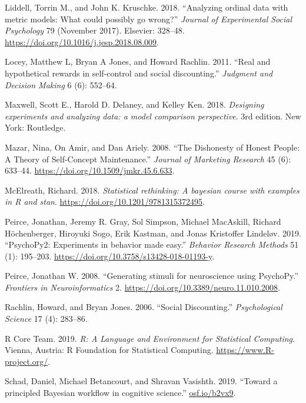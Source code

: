 \documentclass[smallextended]{svjour3}       %
\begin{document}
\leavevmode\hypertarget{ref-Liddell2018}{}%
Liddell, Torrin M., and John K. Kruschke. 2018. ``Analyzing ordinal data
with metric models: What could possibly go wrong?'' \emph{Journal of
Experimental Social Psychology} 79 (November 2017). Elsevier: 328--48.
\url{https://doi.org/10.1016/j.jesp.2018.08.009}.

\leavevmode\hypertarget{ref-Locey2011}{}%
Locey, Matthew L, Bryan A Jones, and Howard Rachlin. 2011. ``Real and
hypothetical rewards in self-control and social discounting.''
\emph{Judgment and Decision Making} 6 (6): 552--64.

\leavevmode\hypertarget{ref-Maxwell2018}{}%
Maxwell, Scott E., Harold D. Delaney, and Kelley Ken. 2018.
\emph{Designing experiments and analyzing data: a model comparison
perspective}. 3rd edition. New York: Routledge.

\leavevmode\hypertarget{ref-Mazar2008}{}%
Mazar, Nina, On Amir, and Dan Ariely. 2008. ``The Dishonesty of Honest
People: A Theory of Self-Concept Maintenance.'' \emph{Journal of
Marketing Research} 45 (6): 633--44.
\url{https://doi.org/10.1509/jmkr.45.6.633}.

\leavevmode\hypertarget{ref-McElreath2018}{}%
McElreath, Richard. 2018. \emph{Statistical rethinking: A bayesian
course with examples in R and stan}.
\url{https://doi.org/10.1201/9781315372495}.

\leavevmode\hypertarget{ref-Peirce2019}{}%
Peirce, Jonathan, Jeremy R. Gray, Sol Simpson, Michael MacAskill,
Richard Höchenberger, Hiroyuki Sogo, Erik Kastman, and Jonas Kristoffer
Lindeløv. 2019. ``PsychoPy2: Experiments in behavior made easy.''
\emph{Behavior Research Methods} 51 (1): 195--203.
\url{https://doi.org/10.3758/s13428-018-01193-y}.

\leavevmode\hypertarget{ref-Peirce2008}{}%
Peirce, Jonathan W. 2008. ``Generating stimuli for neuroscience using
PsychoPy.'' \emph{Frontiers in Neuroinformatics} 2.
\url{https://doi.org/10.3389/neuro.11.010.2008}.

\leavevmode\hypertarget{ref-Rachlin2006}{}%
Rachlin, Howard, and Bryan Jones. 2006. ``Social Discounting.''
\emph{Psychological Science} 17 (4): 283--86.

\leavevmode\hypertarget{ref-R2019}{}%
R Core Team. 2019. \emph{R: A Language and Environment for Statistical
Computing}. Vienna, Austria: R Foundation for Statistical Computing.
\url{https://www.R-project.org/}.

\leavevmode\hypertarget{ref-Schad2019}{}%
Schad, Daniel, Michael Betancourt, and Shravan Vasishth. 2019. ``Toward
a principled Bayesian workflow in cognitive science.''
\url{osf.io/b2vx9}.
\end{document}
